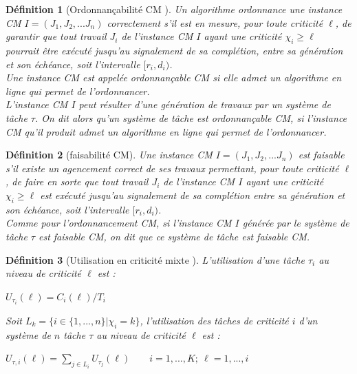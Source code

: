 \documentclass[12pt,a4paper,oneside]{book}
\theoremstyle{break}
\newtheorem{defin}{Définition}[chapter]
\theoremstyle{breakplain}
\begin{document}
\begin{defin}[Ordonnançabilité CM \cite{BaruahBDMSS11}]
Un algorithme ordonnance une instance CM $I = (J_1, J_2, ... J_n)$ correctement s'il est en mesure, pour toute criticité $\ell$, de garantir que tout travail $J_i$ de l'instance CM $I$ ayant une criticité $\chi_i \geq \ell$ pourrait être exécuté jusqu'au signalement de sa complétion, entre sa génération et son échéance, soit l'intervalle $[r_i, d_i)$.\\ Une instance CM est appelée ordonnançable CM si elle admet un algorithme en ligne qui permet de l'ordonnancer.\\

L'instance CM $I$ peut résulter d'une génération de travaux par un système de tâche $\tau$. On dit alors qu'un système de tâche est ordonnançable CM, si l'instance CM qu'il produit admet un algorithme en ligne qui permet de l'ordonnancer.
\end{defin}

\begin{defin}[faisabilité CM]
Une instance CM $I = (J_1, J_2, ... J_n)$ est faisable s'il existe un agencement correct de ses travaux permettant, pour toute criticité $\ell$, de faire en sorte que tout travail $J_i$ de l'instance CM $I$ ayant une criticité $\chi_i \geq \ell$ est exécuté jusqu'au signalement de sa complétion entre sa génération et son échéance, soit l'intervalle $[r_i, d_i)$.\\

Comme pour l'ordonnancement CM, si l'instance CM $I$ générée par le système de tâche $\tau$ est faisable CM, on dit que ce système de tâche est faisable CM.
\end{defin}

\begin{defin}[Utilisation en criticité mixte \cite{BaruahBDMSS11}]
L'utilisation d'une tâche $\tau_i$ au niveau de criticité $\ell$ est :
\begin{center}
$U_{\tau_i}(\ell) = C_i(\ell)/T_i$
\end{center}
Soit $L_k = \{i \in \{1, ..., n\} | \chi_i = k\}$, l'utilisation des tâches de criticité $i$ d'un système de $n$ tâche $\tau$ au niveau de criticité $\ell$ est :
\begin{center}
$U_{\tau, i}(\ell) = \underset{j \in L_i}{\sum} U_{\tau_j}(\ell) \qquad i = 1,...,K;\ \ell = 1,...,i$
\end{center}
\end{defin}
\end{document}
